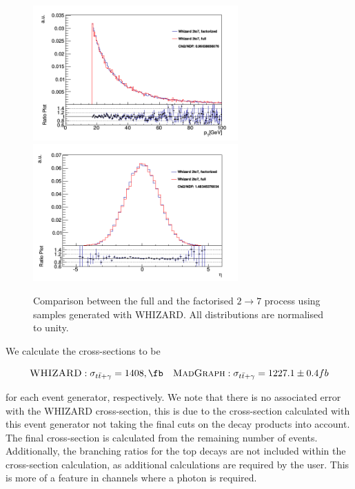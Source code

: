\begin{figure} \label{fig-WHIZARDfullvsfactorised}
\begin{center}
\includegraphics[width=0.7\textwidth]{Figures/WHIZARDfullvsfactorisedPT.png} \\
\includegraphics[width=0.7\textwidth]{Figures/WHIZARDfullvsfactorisedEta.png} \\
\caption{Comparison between the full and the factorised $2 \to 7$ process using samples generated with WHIZARD. All distributions are normalised to unity. \cite{ttgammasimulation}}
\end{center}
\end{figure}  

We calculate the cross-sections to be 

\begin{equation}
\WHIZARD : \sigma_{t\bar{t}+\gamma} = 1408, \fb \quad \MADGRAPH : \sigma_{t\bar{t}+\gamma} = 1227.1 \pm 0.4 fb
\end{equation}

for each event generator, respectively. We note that there is no associated error with the WHIZARD cross-section, this is due to the cross-section calculated with this event generator not taking the final cuts on the decay products into account. The final cross-section is calculated from the remaining number of events. Additionally, the branching ratios for the top decays are not included within the cross-section calculation, as additional calculations are required by the user. This is more of a feature in channels where a photon is required. 

